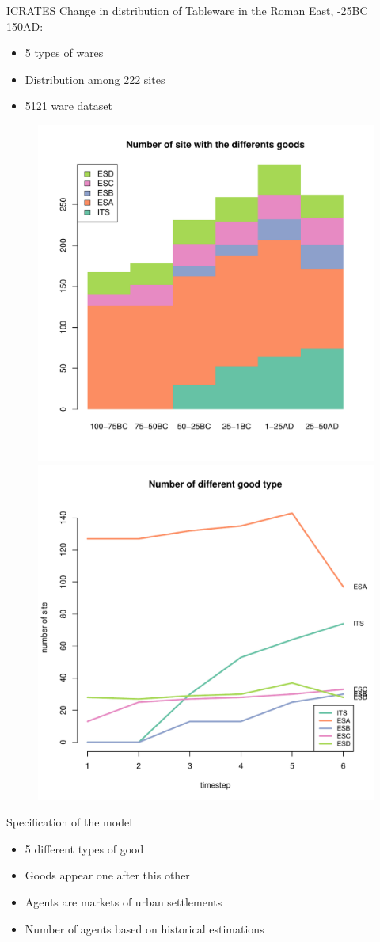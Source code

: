 \documentclass[12pt, notes=show]{beamer}
\begin{document}
\begin{frame}{ICRATES}
    \footnotesize
    \vspace{.5cm}
Change in distribution of Tableware in the  Roman East, -25BC 150AD:
    \begin{itemize}
	\item 5 types of wares 
	\item Distribution among 222 sites
	\item 5121 ware dataset
 \end{itemize}

 \begin{figure}
     \includegraphics[width=.45\textwidth]{../images/hmNbSiteWGoodData.pdf}
     \includegraphics[width=.45\textwidth]{../images/plotNbSiteWGoodData.pdf}
     
 \end{figure}
\end{frame}

\begin{frame}{Specification of the model}
    \vspace{1cm}
	    \begin{itemize}
		\item<+-> 5 different types of good 
		\item<+-> Goods appear one after this other
		\item<+-> Agents are markets of urban settlements
		\item<+-> Number of agents based on historical estimations
	    \end{itemize}
    
\end{frame}
\end{document}
